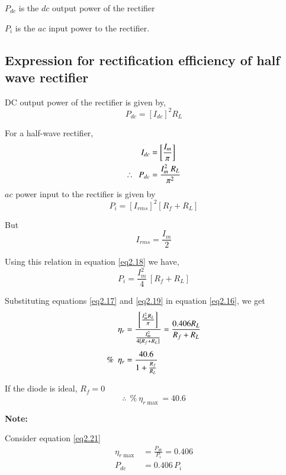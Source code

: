 $P_{dc}$ is the $dc$ output power of the rectifier

$P_i$ is the $ac$ input power to the rectifier.

\subsection{Expression for rectification efficiency of half wave
  rectifier}\label{subsec2.5.1}

DC output power of the rectifier is given by, 
$$
P_{dc} = [I_{dc}]^2 R_L
$$

For a half-wave rectifier,
\begin{align}
I_{dc} & = \left[\frac{I_{m}}{\pi} \right] \notag\\
\therefore ~~ P_{dc} & = \frac{I^2_m\; R_L}{\pi^2} \label{eq2.17}
\end{align}
$ac$ power input to the rectifier is given by 
\begin{equation}
P_i = [I_{rms}]^2 [R_f + R_L] \label{eq2.18}
\end{equation}

\eject

But
$$
I_{rms} = \frac{I_m}{2}
$$

Using this relation in equation \eqref{eq2.18} we have,
\begin{equation}
P_i = \frac{I^2_m}{4}\, [R_f + R_L] \label{eq2.19}
\end{equation}

Substituting equations \eqref{eq2.17} and \eqref{eq2.19} in equation
\eqref{eq2.16}, we get
\begin{align}
\eta_r & = \frac{\left[\frac{I^2_m R_L}{\pi} \right]}{\frac{I^2_m}{4
    [R_f+ R_L]}} = \frac{0.406 R_L}{R_f + R_L} \notag\\[4pt]
\% ~~ \eta_r & = \frac{40.6}{1+\frac{R_f}{R_L}}  \label{eq2.20}
\end{align}

If the diode is ideal, $R_f = 0$
\begin{equation}
\therefore~~ \% ~ \eta_{r \max} = 40.6 \label{eq2.21}
\end{equation}

\medskip
\noindent
\textbf{Note:}

Consider equation \eqref{eq2.21}
\begin{align*}
\eta_{r \max} & = \frac{P_{dc}}{P_i} = 0.406\\
P_{dc} & = 0.406\, P_i
\end{align*}

